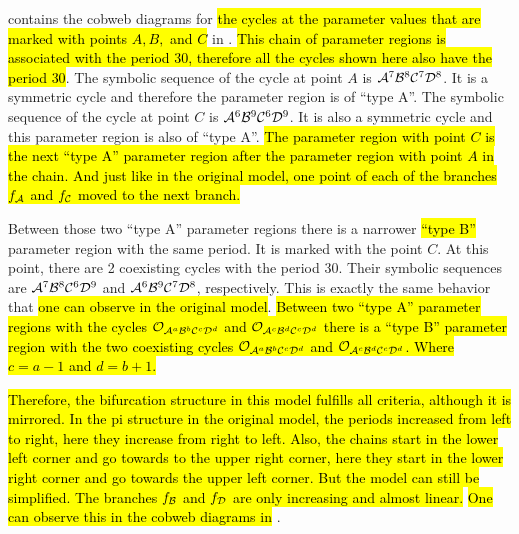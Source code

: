  contains the cobweb diagrams for \hl{the cycles at the parameter values that are marked with points $A, B,$ and $C$} in .
\hl{This chain of parameter regions is associated with the period $30$, therefore all the cycles shown here also have the period $30$}.
The symbolic sequence of the cycle at point $A$ is $\mathcal{A}^7\mathcal{B}^8\mathcal{C}^7\mathcal{D}^8$.
It is a symmetric cycle and therefore the parameter region is of ``type A''.
The symbolic sequence of the cycle at point $C$ is $\mathcal{A}^6\mathcal{B}^9\mathcal{C}^6\mathcal{D}^9$.
It is also a symmetric cycle and this parameter region is also of ``type A''.
\hl{
	The parameter region with point $C$ is the next ``type A'' parameter region after the parameter region with point $A$ in the chain.
	And just like in the original model, one point of each of the branches $f_{\mathcal{A}}$ and $f_{\mathcal{C}}$ moved to the next branch.
}

Between those two ``type A'' parameter regions there is a narrower \hl{``type B''} parameter region with the same period.
It is marked with the point $C$.
At this point, there are 2 coexisting cycles with the period 30.
Their symbolic sequences are $\mathcal{A}^7\mathcal{B}^8\mathcal{C}^6\mathcal{D}^9$ and $\mathcal{A}^6\mathcal{B}^9\mathcal{C}^7\mathcal{D}^8$, respectively.
This is exactly the same behavior that \hl{one can observe in the original model}.
\hl{
	Between two ``type A'' parameter regions with the cycles $\mathcal{O}_{\mathcal{A}^a\mathcal{B}^b\mathcal{C}^c\mathcal{D}^d}$ and $\mathcal{O}_{\mathcal{A}^c\mathcal{B}^d\mathcal{C}^c\mathcal{D}^d}$ there is a ``type B'' parameter region with the two coexisting cycles $\mathcal{O}_{\mathcal{A}^a\mathcal{B}^b\mathcal{C}^c\mathcal{D}^d}$ and $\mathcal{O}_{\mathcal{A}^c\mathcal{B}^d\mathcal{C}^c\mathcal{D}^d}$.
	Where $c = a - 1$ and $d = b + 1$.
}

\hl{
	Therefore, the bifurcation structure in this model fulfills all criteria, although it is mirrored.
	In the \gls{pi} structure in the original model, the periods increased from left to right, here they increase from right to left.
	Also, the chains start in the lower left corner and go towards to the upper right corner, here they start in the lower right corner and go towards the upper left corner.
	But the model can still be simplified.
	The branches $f_{\mathcal{B}}$ and $f_{\mathcal{D}}$ are only increasing and almost linear.
}
\hl{One can observe this in the cobweb diagrams in} .
